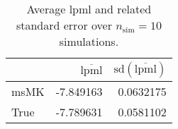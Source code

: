 \begin{table}[H]

\caption{Average lpml and related standard error over $n_{\text{sim}} = 10$ simulations.}
\centering
\begin{tabular}[t]{lrr}
\toprule
  & $\overbar{\text{lpml}}$ & $\text{sd}(\overbar{\text{lpml}})$\\
\midrule
msMK & -7.849163 & 0.0632175\\
True & -7.789631 & 0.0581102\\
\bottomrule
\end{tabular}
\end{table}